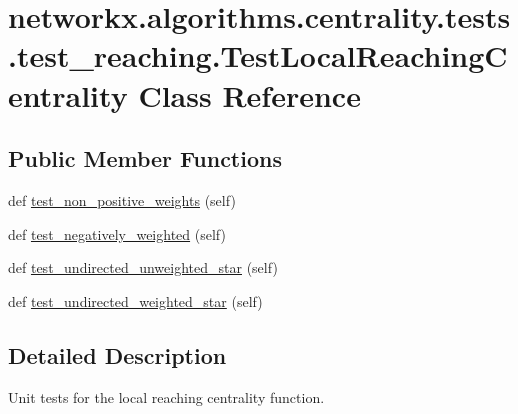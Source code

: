 \hypertarget{classnetworkx_1_1algorithms_1_1centrality_1_1tests_1_1test__reaching_1_1TestLocalReachingCentrality}{}\section{networkx.\+algorithms.\+centrality.\+tests.\+test\+\_\+reaching.\+Test\+Local\+Reaching\+Centrality Class Reference}
\label{classnetworkx_1_1algorithms_1_1centrality_1_1tests_1_1test__reaching_1_1TestLocalReachingCentrality}
\subsection*{Public Member Functions}
\begin{DoxyCompactItemize}
\item 
def \hyperlink{classnetworkx_1_1algorithms_1_1centrality_1_1tests_1_1test__reaching_1_1TestLocalReachingCentrality_af758c2080e8d4b9c51936802b36325fd}{test\+\_\+non\+\_\+positive\+\_\+weights} (self)
\item 
def \hyperlink{classnetworkx_1_1algorithms_1_1centrality_1_1tests_1_1test__reaching_1_1TestLocalReachingCentrality_aa45db7ed3c71d5cf9ae2bb8b46fcab40}{test\+\_\+negatively\+\_\+weighted} (self)
\item 
def \hyperlink{classnetworkx_1_1algorithms_1_1centrality_1_1tests_1_1test__reaching_1_1TestLocalReachingCentrality_a575313013ca416eb14d7ff12a7dab6c7}{test\+\_\+undirected\+\_\+unweighted\+\_\+star} (self)
\item 
def \hyperlink{classnetworkx_1_1algorithms_1_1centrality_1_1tests_1_1test__reaching_1_1TestLocalReachingCentrality_a39162432f1adadfd5504853ae29c1f5b}{test\+\_\+undirected\+\_\+weighted\+\_\+star} (self)
\end{DoxyCompactItemize}


\subsection{Detailed Description}
\begin{DoxyVerb}Unit tests for the local reaching centrality function.\end{DoxyVerb}
 

